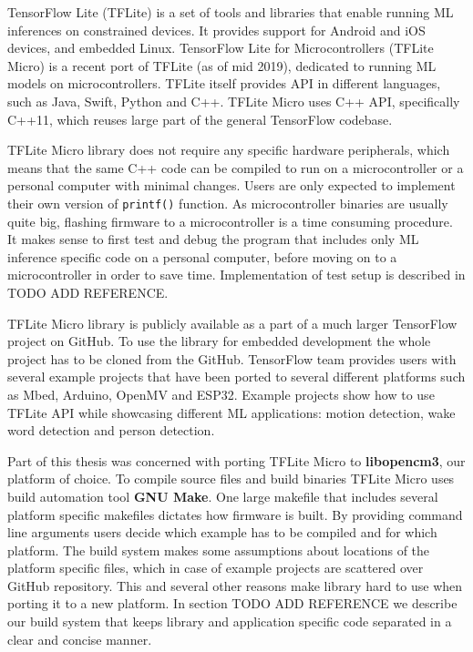 TensorFlow Lite (TFLite) is a set of tools and libraries that enable running ML inferences on constrained devices\cite{tensorflow_github}.
It provides support for Android and iOS devices, and embedded Linux.
TensorFlow Lite for Microcontrollers (TFLite Micro) is a recent port of TFLite (as of mid 2019), dedicated to running ML models on microcontrollers.
TFLite itself provides API in different languages, such as Java, Swift, Python and C++.
TFLite Micro uses C++ API, specifically C++11, which reuses large part of the general TensorFlow codebase.

TFLite Micro library does not require any specific hardware peripherals, which means that the same C++ code can be compiled to run on a microcontroller or a personal computer with minimal changes.
Users are only expected to implement their own version of \verb|printf()| function.
As microcontroller binaries are usually quite big, flashing firmware to a microcontroller is a time consuming procedure.
It makes sense to first test and debug the program that includes only ML inference specific code on a personal computer, before moving on to a microcontroller in order to save time.
Implementation of test setup is described in TODO ADD REFERENCE.

TFLite Micro library is publicly available as a part of a much larger TensorFlow project on GitHub\cite{tensorflow_github}.
To use the library for embedded development the whole project has to be cloned from the GitHub.
TensorFlow team provides users with several example projects that have been ported to several different platforms such as Mbed, Arduino, OpenMV and ESP32.
Example projects show how to use TFLite API while showcasing different ML applications: motion detection, wake word detection and person detection.

Part of this thesis was concerned with porting TFLite Micro to \textbf{libopencm3}, our platform of choice.
To compile source files and build binaries TFLite Micro uses build automation tool \textbf{GNU Make}.
One large makefile that includes several platform specific makefiles dictates how firmware is built.
By providing command line arguments users decide which example has to be compiled and for which platform.
The build system makes some assumptions about locations of the platform specific files, which in case of example projects are scattered over GitHub repository.
This and several other reasons make library hard to use when porting it to a new platform.
In section TODO ADD REFERENCE we describe our build system that keeps library and application specific code separated in a clear and concise manner.

